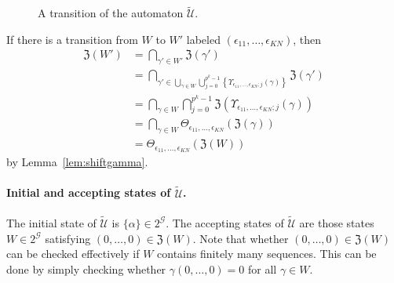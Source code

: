 \documentclass[letterpaper, 11pt, thm-restate]{article}
\numberwithin{equation}{section}
\newcommand{\mG}{\mathcal{G}}
\newcommand{\mZ}{\mathfrak{Z}}
\newcommand{\tU}{\widetilde{\mathscr{U}}}
\theoremstyle{definition}
\theoremstyle{definition}
\theoremstyle{definition}
\begin{document}
\begin{figure}[h]
        \centering
        \caption{A transition of the automaton $\tU$.}
        \label{fig:tU}
    \end{figure}

If there is a transition from $W$ to $W'$ labeled $(\epsilon_{11}, \ldots, \epsilon_{KN})$, then
\begin{align}\label{eq:transtU}
    \mZ(W') & = \bigcap_{\gamma' \in W'} \mZ(\gamma') \nonumber\\
        & = \bigcap_{\gamma' \in \bigcup_{\gamma \in W} \bigcup_{j = 0}^{p^k-1} \left\{\Upsilon_{\epsilon_{11}, \ldots, \epsilon_{KN}; j}(\gamma)\right\}} \mZ(\gamma') \nonumber\\
        & = \bigcap_{\gamma \in W} \bigcap_{j = 0}^{p^k-1} \mZ(\Upsilon_{\epsilon_{11}, \ldots, \epsilon_{KN}; j}(\gamma)) \nonumber\\
        & = \bigcap_{\gamma \in W} \Theta_{\epsilon_{11}, \ldots, \epsilon_{KN}}\left(\mZ(\gamma)\right) \nonumber\\
        & = \Theta_{\epsilon_{11}, \ldots, \epsilon_{KN}} \left(\mZ(W)\right)
\end{align}
by Lemma~\ref{lem:shiftgamma}.

\paragraph{Initial and accepting states of $\tU$.}
    
The initial state of $\tU$ is $\{\alpha\} \in 2^{\mG}$.
The accepting states of $\tU$ are those states $W \in 2^{\mG}$ satisfying
$
    (0, \ldots, 0) \in \mZ(W)
$.
Note that whether $(0, \ldots, 0) \in \mZ(W)$ can be checked effectively if $W$ contains finitely many sequences.
This can be done by simply checking whether $\gamma(0, \ldots, 0) = 0$ for all $\gamma \in W$.
\end{document}
